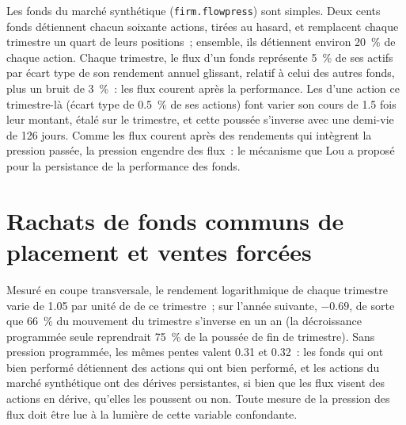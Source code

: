 Les fonds du marché synthétique (\texttt{firm.flowpress}) sont simples. Deux cents fonds détiennent chacun soixante actions, tirées au hasard, et remplacent chaque trimestre un quart de leurs
positions~; ensemble, ils détiennent environ 20~\% de chaque action. Chaque trimestre, le flux d'un fonds représente 5~\% de ses actifs par écart type de son rendement
annuel glissant, relatif à celui des autres fonds, plus un bruit de 3~\%~: les flux courent après la performance. Les  d'une action ce trimestre-là (écart type de 0.5~\% de
ses actions) font varier son cours de 1.5 fois leur montant, étalé sur le trimestre, et cette poussée s'inverse avec une demi-vie de 126 jours. Comme les flux courent après
des rendements qui intègrent la pression passée, la pression engendre des flux~: le mécanisme que Lou a proposé pour la persistance de la performance des fonds.

\section{Rachats de fonds communs de placement et ventes forcées}

Mesuré en coupe transversale, le rendement logarithmique de chaque trimestre varie de 1.05 par unité de  de ce trimestre~; sur l'année suivante, $-0.69$, de sorte que
66~\% du mouvement du trimestre s'inverse en un an (la décroissance programmée seule reprendrait 75~\% de la poussée de fin de trimestre). Sans pression programmée, les
mêmes pentes valent 0.31 et 0.32~: les fonds qui ont bien performé détiennent des actions qui ont bien performé, et les actions du marché synthétique ont des dérives persistantes, si bien que les flux visent
des actions en dérive, qu'elles les poussent ou non. Toute mesure de la pression des flux doit être lue à la lumière de cette variable confondante.

